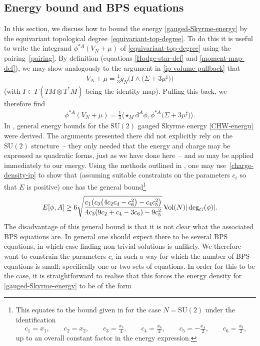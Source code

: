 \documentclass[pdftex]{sigma}
\newcommand{\SU}{{\mathrm{SU}}}
\newcommand{\1}{{\mathbb{1}}}
\def \d{\mathrm{d}}
\numberwithin{equation}{section}
\begin{document}
\subsection{Energy bound and BPS equations}%

In this section, we discuss how to bound the energy \eqref{gauged-Skyrme-energy} by the equivariant topological degree~\eqref{equivariant-top-degree}. To do this it is useful to write the integrand $\phi^{\ast A}(V_N+\mu)$ of \eqref{equivariant-top-degree} using the pairing~\eqref{pairing}. By definition (equations \eqref{Hodge-star-def} and \eqref{moment-map-def}), we may show analogously to the argument in \eqref{ip-volume-pullback} that
\begin{align*}
 V_N+\mu=\tfrac{1}{3}g_N\big(I\wedge\big(\Sigma+3\mu^\sharp\big)\big)
\end{align*}
(with $I\in\Gamma(TM\otimes T^\ast M)$ being the identity map). Pulling this back, we therefore find
\begin{align}\label{charge-density-ip}
 \phi^{\ast A}(V_N+\mu)=\tfrac{1}{3}\bigl\langle \star_{M}\d^A\phi,\phi^{\ast A}\big(\Sigma+3\mu^\sharp\big)\bigr\rangle.
\end{align}
In \cite{CorkHarlandWinyard2021gaugedskyrmelowbinding}, general energy bounds for the $\SU(2)$ gauged Skyrme energy \eqref{CHW-energu} were derived. The arguments presented there did not explicitly rely on the $\SU(2)$ structure~-- they only needed that the energy and charge may be expressed as quadratic forms, just as we have done here~-- and so may be applied immediately to our energy. Using the methods outlined in \cite{CorkHarlandWinyard2021gaugedskyrmelowbinding}, one may use~\eqref{charge-density-ip} to show that (assuming suitable constraints on the parameters $c_i$ so that $E$ is positive) one has the general bound\footnote{This equates to the bound given in \cite{CorkHarlandWinyard2021gaugedskyrmelowbinding} for the case $N=\SU(2)$ under the identification
\[
c_1=x_1,\qquad c_2 =x_2,\qquad c_3=\tfrac{x_5}{4},\qquad
 c_4 =\tfrac{x_6}{2},\qquad c_5=-\tfrac{x_4}{2},\qquad c_6 =\tfrac{x_3}{2},
 \]
up to an overall constant factor in the energy expression.}
\begin{align*}%
E[\phi,A]\geq6\sqrt{\frac{c_1\big(c_3\big(4c_2c_4-c_6^2\big)-c_4c_5^2\big)}{4c_3(9c_2+c_4-3c_6)-9c_5^2}}\,{\rm Vol}(N)|\deg_G(\phi)|.
\end{align*}
The disadvantage of this general bound is that it is not clear what the associated BPS equations are. In general one should expect there to be several BPS equations, in which case finding non-trivial solutions is unlikely. We therefore want to constrain the parameters $c_i$ in such a way for which the number of BPS equations is small; specifically one or two sets of equations. In order for this to be the case, it is straightforward to realise that this forces the energy density for \eqref{gauged-Skyrme-energy} to be of the form
\end{document}
